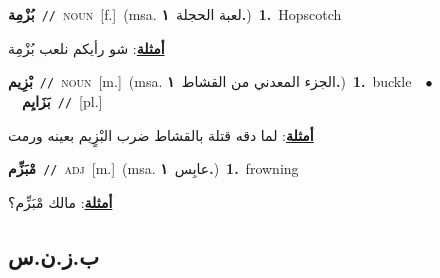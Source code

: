 \documentclass[10pt,a4paper,twoside]{article} %
\begin{document}
\begin{multicols}{2}
{\setlength\topsep{0pt}\textbf{\foreignlanguage{arabic}{بُزْمِة}}\ {\color{gray}\texttt{//}\color{black}}\ \textsc{noun}\ [f.]\ \color{gray}(msa. \foreignlanguage{arabic}{لعبة الحجلة}~\foreignlanguage{arabic}{\textbf{١.}})\color{black}\ \textbf{1.}~Hopscotch\  \begin{flushright}\color{gray}\foreignlanguage{arabic}{\textbf{\underline{\foreignlanguage{arabic}{أمثلة}}}: شو رأيكم نلعب بُزْمِة}\end{flushright}\color{black}} \vspace{2mm}

{\setlength\topsep{0pt}\textbf{\foreignlanguage{arabic}{بْزِيم}}\ {\color{gray}\texttt{//}\color{black}}\ \textsc{noun}\ [m.]\ \color{gray}(msa. \foreignlanguage{arabic}{الجزء المعدني من القشاط}~\foreignlanguage{arabic}{\textbf{١.}})\color{black}\ \textbf{1.}~buckle\ \ $\bullet$\ \ \setlength\topsep{0pt}\textbf{\foreignlanguage{arabic}{بَزَايِم}}\ {\color{gray}\texttt{//}\color{black}}\ [pl.]\  \begin{flushright}\color{gray}\foreignlanguage{arabic}{\textbf{\underline{\foreignlanguage{arabic}{أمثلة}}}: لما دقه قتلة بالقشاط ضرب البْزٍيم بعينه ورمت}\end{flushright}\color{black}} \vspace{2mm}

{\setlength\topsep{0pt}\textbf{\foreignlanguage{arabic}{مْبَزِّم}}\ {\color{gray}\texttt{//}\color{black}}\ \textsc{adj}\ [m.]\ \color{gray}(msa. \foreignlanguage{arabic}{عابِس}~\foreignlanguage{arabic}{\textbf{١.}})\color{black}\ \textbf{1.}~frowning\  \begin{flushright}\color{gray}\foreignlanguage{arabic}{\textbf{\underline{\foreignlanguage{arabic}{أمثلة}}}: مالك مْبَزِّم؟}\end{flushright}\color{black}} \vspace{2mm}

\vspace{-3mm}
\subsection*{\color{blue}\foreignlanguage{arabic}{ب.ز.ن.س}\color{blue}{ (ntws)}} 


\end{multicols}
\end{document}
